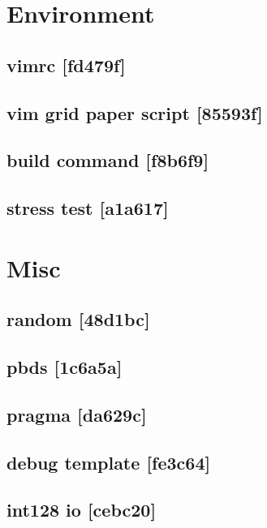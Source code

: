 \onehalfspacing
\tableofcontents
\singlespacing

\section{Environment}
\subsection{vimrc {\footnotesize [fd479f]} }

\subsection{vim grid paper script {\footnotesize [85593f]} }

\subsection{build command {\footnotesize [f8b6f9]} }

\subsection{stress test {\footnotesize [a1a617]} }


\section{Misc}
\subsection{random {\footnotesize [48d1bc]} }

\subsection{pbds {\footnotesize [1c6a5a]} }

\subsection{pragma {\footnotesize [da629c]} }

\subsection{debug template {\footnotesize [fe3c64]} }

\subsection{int128 io {\footnotesize [cebc20]} }

